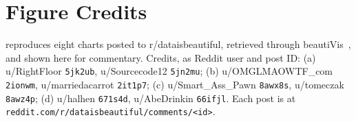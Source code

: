 \documentclass{vgtc}
\begin{document}
\section*{Figure Credits}
\label{sec:figure_credits}
 reproduces eight charts posted to r/dataisbeautiful, retrieved through beautiVis~\cite{lin2026beautivis}, and shown here for commentary. Credits, as Reddit user and post ID: (a) u/RightFloor \texttt{5jk2ub}, u/Sourcecode12 \texttt{5jn2mu}; (b) u/OMGLMAOWTF\_com \texttt{2ionwm}, u/marriedacarrot \texttt{2it1p7}; (c) u/Smart\_Ass\_Pawn \texttt{8awx8s}, u/tomeczak \texttt{8awz4p}; (d) u/halhen \texttt{671s4d}, u/AbeDrinkin \texttt{66ifjl}. Each post is at \texttt{reddit.com/r/dataisbeautiful/comments/<id>}.



\end{document}
